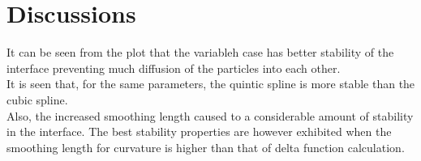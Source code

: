 \section{Discussions}

It can be seen from the plot that the variableh case has better stability of the interface preventing much diffusion of the particles into each other.\\

It is seen that, for the same parameters, the quintic spline is more stable than the cubic spline.\\

Also, the increased smoothing length caused to a considerable amount of stability in the interface. The best stability properties are however exhibited when the smoothing length for curvature is higher than that of delta function calculation.

